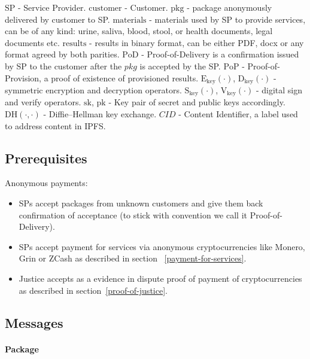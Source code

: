\documentclass{ieeeaccess}
\begin{document}
\(\mathrm{SP}\) - Service Provider. \(\mathrm{customer}\) - Customer.
\(\mathrm{pkg}\) - package anonymously delivered by customer to SP.
\(\mathrm{materials}\) - materials used by SP to provide services, can
be of any kind: urine, saliva, blood, stool, or health documents, legal
documents etc. \(\mathrm{results}\) - results in binary format, can be
either PDF, docx or any format agreed by both parities. \(\mathrm{PoD}\)
- Proof-of-Delivery is a confirmation issued by SP to the customer after
the \(pkg\) is accepted by the SP. \(\mathrm{PoP}\) -
Proof-of-Provision, a proof of existence of provisioned results.
\(\mathrm{E}_\mathrm{key}(\cdot)\), \(\mathrm{D}_\mathrm{key}(\cdot)\) -
symmetric encryption and decryption operators.
\(\mathrm{S}_\mathrm{key}(\cdot)\), \(\mathrm{V}_\mathrm{key}(\cdot)\) -
digital sign and verify operators. \(\mathrm{sk}\), \(\mathrm{pk}\) -
Key pair of secret and public keys accordingly.
\(\mathrm{DH}(\cdot, \cdot)\) - Diffie--Hellman key exchange. \(CID\) -
Content Identifier, a label used to address content in IPFS.

\subsection{Prerequisites}

Anonymous payments:

\begin{itemize}

\item
  SPs accept packages from unknown customers and give them back
  confirmation of acceptance (to stick with convention we call it
  Proof-of-Delivery).
\item
  SPs accept payment for services via anonymous cryptocurrencies like
  Monero, Grin or ZCash as described in section ~\ref{payment-for-services}.
\item
  Justice accepts as a evidence in dispute proof of payment of
  cryptocurrencies as described in section~\ref{proof-of-justice}.
\end{itemize}

\subsection{Messages}\label{messages}

\paragraph{Package}\label{package}
\end{document}
